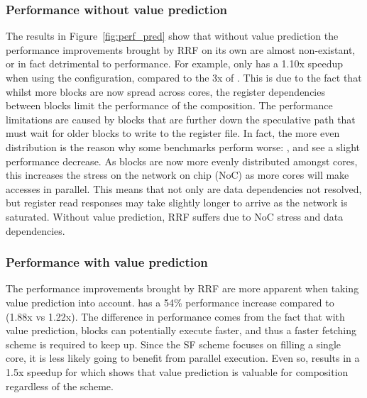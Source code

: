 \subsubsection{Performance without value prediction}
The results in Figure~\ref{fig:perf_pred} show that without value prediction the performance improvements brought by RRF on its own are almost non-existant, or in fact detrimental to performance.
For example,  only has a 1.10x speedup when using the \nfnovp{} configuration, compared to the 3x of \nfvp{}.
This is due to the fact that whilst more blocks are now spread across cores, the register dependencies between blocks limit the performance of the composition. 
The performance limitations are caused by blocks that are further down the speculative path that must wait for older blocks to write to the register file.
In fact, the more even distribution is the reason why some benchmarks perform worse: ,  and  see a slight performance decrease.
As blocks are now more evenly distributed amongst cores, this increases the stress on the network on chip (NoC) as more cores will make accesses in parallel.
This means that not only are data dependencies not resolved, but register read responses may take slightly longer to arrive as the network is saturated.
Without value prediction, RRF suffers due to NoC stress and data dependencies.


\subsubsection{Performance with value prediction}
The performance improvements brought by RRF are more apparent when taking value prediction into account.
\nfvp{} has a 54\% performance increase compared to \vp{} (1.88x vs 1.22x).
The difference in performance comes from the fact that with value prediction, blocks can potentially execute faster, and thus a faster fetching scheme is required to keep up.
Since the SF scheme focuses on filling a single core, it is less likely going to benefit from parallel execution.
Even so, \vp{} results in a 1.5x speedup for  which shows that value prediction is valuable for composition regardless of the scheme.


